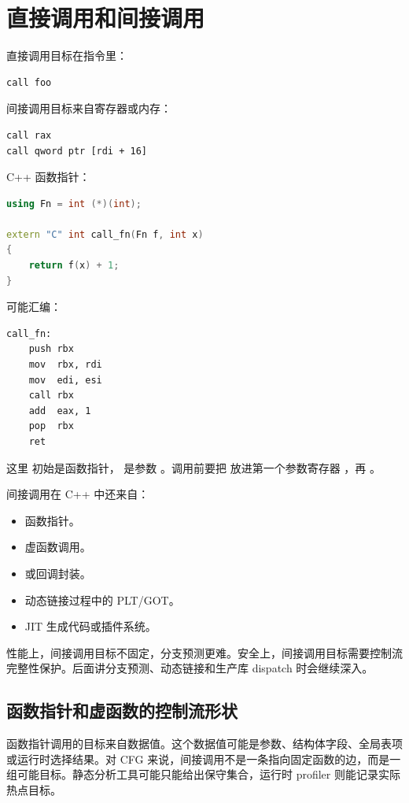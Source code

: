 \section{直接调用和间接调用}

直接调用目标在指令里：

\begin{lstlisting}
call foo
\end{lstlisting}

间接调用目标来自寄存器或内存：

\begin{lstlisting}
call rax
call qword ptr [rdi + 16]
\end{lstlisting}

C++ 函数指针：

\begin{lstlisting}[language=C++]
using Fn = int (*)(int);

extern "C" int call_fn(Fn f, int x)
{
    return f(x) + 1;
}
\end{lstlisting}

可能汇编：

\begin{lstlisting}
call_fn:
    push rbx
    mov  rbx, rdi
    mov  edi, esi
    call rbx
    add  eax, 1
    pop  rbx
    ret
\end{lstlisting}

这里  初始是函数指针， 是参数 。调用前要把  放进第一个参数寄存器 ，再 。

间接调用在 C++ 中还来自：

\begin{itemize}
  \item 函数指针。
  \item 虚函数调用。
  \item {} 或回调封装。
  \item 动态链接过程中的 PLT/GOT。
  \item JIT 生成代码或插件系统。
\end{itemize}

性能上，间接调用目标不固定，分支预测更难。安全上，间接调用目标需要控制流完整性保护。后面讲分支预测、动态链接和生产库 dispatch 时会继续深入。

\subsection{函数指针和虚函数的控制流形状}

函数指针调用的目标来自数据值。这个数据值可能是参数、结构体字段、全局表项或运行时选择结果。对 CFG 来说，间接调用不是一条指向固定函数的边，而是一组可能目标。静态分析工具可能只能给出保守集合，运行时 profiler 则能记录实际热点目标。

